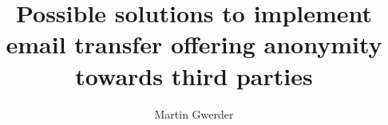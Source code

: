 \documentclass[11pt,a4paper]{book}
\title{Possible solutions to implement email transfer offering anonymity towards third parties}
\author{Martin Gwerder}
\date{\SVNDate}
\begin{document}
\frontmatter



\begin{comment}
\begin{abstracts}        %
FIXME abstract is still missing
\end{abstracts}

\begin{acknowledgements}      %
I would like to thank my wife Cornelia and my lovely three kids (Saphira, Florian and Aurelius) for their patience and their support. Without them I could never have done this work.\par

FIXME Professor\par
FIXME university\par
I would like to acknowledge the thousands of individuals who have coded for the LaTeX project for free. It is due to their efforts that we can generate professionally typeset PDFs now.
\end{acknowledgements}
\end{comment}


\tableofcontents
\listoftables
\listoffigures

\mainmatter












\end{document}
